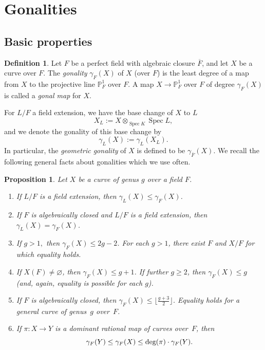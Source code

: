 \documentclass[11pt,reqno]{amsart}
\renewcommand{\P}{\mathbb{P}}
\newcommand{\Spec}{\operatorname{Spec}}
\newtheorem{proposition}[theorem]{Proposition}
\theoremstyle{definition}
\newtheorem{definition}[theorem]{Definition}
\begin{document}

\section{Gonalities}\label{section: gonalities}

\subsection{Basic properties}


\begin{definition}
Let $F$ be a perfect field with algebraic closure $\overline{F}$, and let $X$ be a curve over $F$. The \emph{gonality} $\gamma_F(X)$ of $X$ (over $F$) is the least degree of a map from $X$ to the projective line $\P^1_F$ over $F$. A map $X \to \mathbb{P}^1_F$ over $F$ of degree $\gamma_F(X)$ is called a \emph{gonal map} for $X$. 
\end{definition}

For $L/F$ a field extension, we have the base change of $X$ to $L$
\[ X_L := X \otimes_{\Spec K} \Spec L, \]
and we denote the gonality of this base change by
\[ \gamma_L(X) := \gamma_L(X_L). \]
In particular, the \emph{geometric gonality} of $X$ is defined to be $\gamma_{\overline{F}}(X)$. We recall the following general facts about gonalities which we use often.

\begin{proposition}\cite[Proposition A.1]{Poonen}\label{Prop: Poonen_gonality}
Let $X$ be a curve of genus $g$ over a field $F$. 
\begin{enumerate}
    \item If $L/F$ is a field extension, then $\gamma_L(X) \leq \gamma_F(X)$. 
    \item If $F$ is algebraically closed and $L/F$ is a field extension, then $\gamma_L(X) = \gamma_F(X)$. 
    \item If $g>1,$ then $\gamma_F(X) \leq 2g-2$. For each $g>1$, there exist $F$ and $X/F$ for which equality holds. 
    \item If $X(F) \neq \varnothing$, then $\gamma_F(X) \leq g+1$. If further $g \geq 2$, then $\gamma_F(X) \leq g$ (and, again, equality is possible for each $g$). 
    \item If $F$ is algebraically closed, then $\gamma_F(X) \leq \lfloor \frac{g+3}{2} \rfloor$. Equality holds for a general curve of genus~$g$ over~$F$.
    \item If $\pi\colon X \to Y$ is a dominant rational map of curves over~$F$, then 
    \[
    \gamma_F(Y) \leq \gamma_F(X)\leq \textnormal{deg}(\pi)\cdot \gamma_F(Y).
    \]
\end{enumerate}
\end{proposition}
\end{document}
